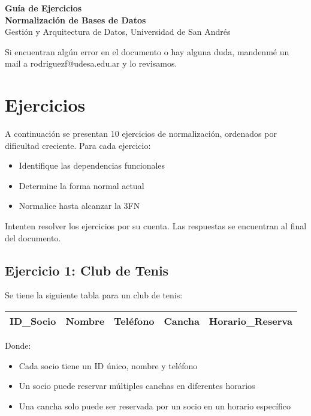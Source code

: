 \documentclass[12pt]{article}
\begin{document}
\begin{center}
  {\LARGE \textbf{Guía de Ejercicios \\ Normalización de Bases de Datos}}\\[0.5em]
  {Gestión y Arquitectura de Datos, Universidad de San Andrés}
\end{center}

Si encuentran algún error en el documento o hay alguna duda, mandenmé un mail a rodriguezf@udesa.edu.ar y lo revisamos.

\section{Ejercicios}

A continuación se presentan 10 ejercicios de normalización, ordenados por dificultad creciente. Para cada ejercicio:
\begin{itemize}
    \item Identifique las dependencias funcionales
    \item Determine la forma normal actual
    \item Normalice hasta alcanzar la 3FN
\end{itemize}

Intenten resolver los ejercicios por su cuenta. Las respuestas se encuentran al final del documento.

\subsection{Ejercicio 1: Club de Tenis}
Se tiene la siguiente tabla para un club de tenis:
\vspace{0.5em}
\begin{center}
\begin{tabular}{|l|l|l|l|l|}
\hline
ID\_Socio & Nombre & Teléfono & Cancha & Horario\_Reserva \\
\hline
\end{tabular}
\end{center}

Donde:
\begin{itemize}
    \item Cada socio tiene un ID único, nombre y teléfono
    \item Un socio puede reservar múltiples canchas en diferentes horarios
    \item Una cancha solo puede ser reservada por un socio en un horario específico
\end{itemize}
\end{document}
